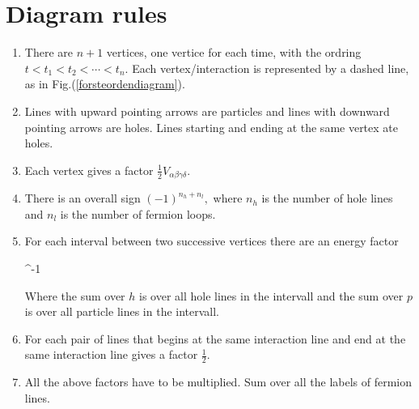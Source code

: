 \chapter{Diagram rules} \label{diagramregler}

\begin{enumerate}
\item There are $n+1$ vertices, one vertice for each time, with the ordring
$t<t_1<t_2 < \cdots < t_n.$ Each vertex/interaction is represented by a 
dashed line, as in Fig.(\ref{forsteordendiagram}). 

\item Lines with upward pointing arrows are particles and lines with 
downward pointing arrows are holes. Lines starting and ending at the same 
vertex ate holes.

\item Each vertex gives a factor $\frac{1}{2}V_{\alpha\beta\gamma\delta}.$

\item There is an overall sign $(-1)^{n_h+n_l},$ where $n_h$ is the number
of hole lines and $n_l$ is the number of fermion loops.

\item For each interval between two successive vertices there are an energy
factor 

\beq
{}^{-1}
\eeq

Where the sum over $h$ is over all hole lines in the intervall and the sum 
over $p$ is over all particle lines in the intervall.

\item For each pair of lines that begins at the same interaction line and 
end at the same interaction line gives a factor $\frac{1}{2}.$

\item All the above factors have to be multiplied. Sum over all the labels 
of fermion lines. 











\end{enumerate}
